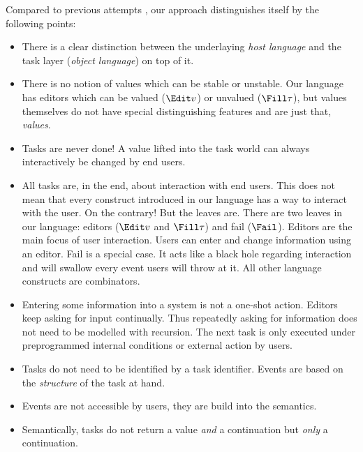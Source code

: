 Compared to previous attempts \cite{conf/ifl/KoopmanPA08,conf/ppdp/PlasmeijerLMAK12,theses/radboud/VinterHviid18},
our approach distinguishes itself by the following points:
\begin{itemize}
  \item
    There is a clear distinction between the underlaying \emph{host language}
    and the task layer (\emph{object language}) on top of it.
  \item
    There is no notion of values which can be stable or unstable.
    Our language has editors which can be valued ($\Edit v$) or unvalued ($\Fill \tau$),
    but values themselves do not have special distinguishing features and are just that, \emph{values}.
  \item
    Tasks are never done!
    A value lifted into the task world can always interactively be changed by end users.
  \item
    All tasks are, in the end, about interaction with end users.
    This does not mean that every construct introduced in our language has a way to interact with the user.
    On the contrary!
    But the leaves are.
    There are two leaves in our language: editors ($\Edit v$ and $\Fill \tau$) and fail ($\Fail$).
    Editors are the main focus of user interaction.
    Users can enter and change information using an editor.
    Fail is a special case.
    It acts like a black hole regarding interaction and will swallow every event users will throw at it.
    All other language constructs are combinators.
  \item
    Entering some information into a system is not a one-shot action.
    Editors keep asking for input continually.
    Thus repeatedly asking for information does not need to be modelled with recursion.
    The next task is only executed under preprogrammed internal conditions or external action by users.
  \item
    Tasks do not need to be identified by a task identifier.
    Events are based on the \emph{structure} of the task at hand.
  \item
    Events are not accessible by users, they are build into the semantics.
  \item
    Semantically, tasks do not return a value \emph{and} a continuation
    but \emph{only} a continuation.

\end{itemize}
